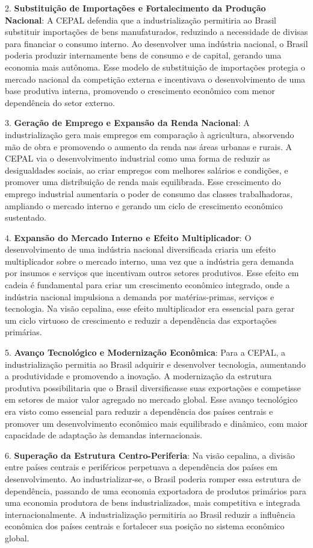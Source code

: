 \documentclass[a4paper,12pt]{article}[abntex2]
\begin{document}
2. \textbf{Substituição de Importações e Fortalecimento da Produção Nacional}: A CEPAL defendia que a industrialização permitiria ao Brasil substituir importações de bens manufaturados, reduzindo a necessidade de divisas para financiar o consumo interno. Ao desenvolver uma indústria nacional, o Brasil poderia produzir internamente bens de consumo e de capital, gerando uma economia mais autônoma. Esse modelo de substituição de importações protegia o mercado nacional da competição externa e incentivava o desenvolvimento de uma base produtiva interna, promovendo o crescimento econômico com menor dependência do setor externo.

3. \textbf{Geração de Emprego e Expansão da Renda Nacional}: A industrialização gera mais empregos em comparação à agricultura, absorvendo mão de obra e promovendo o aumento da renda nas áreas urbanas e rurais. A CEPAL via o desenvolvimento industrial como uma forma de reduzir as desigualdades sociais, ao criar empregos com melhores salários e condições, e promover uma distribuição de renda mais equilibrada. Esse crescimento do emprego industrial aumentaria o poder de consumo das classes trabalhadoras, ampliando o mercado interno e gerando um ciclo de crescimento econômico sustentado.

4. \textbf{Expansão do Mercado Interno e Efeito Multiplicador}: O desenvolvimento de uma indústria nacional diversificada criaria um efeito multiplicador sobre o mercado interno, uma vez que a indústria gera demanda por insumos e serviços que incentivam outros setores produtivos. Esse efeito em cadeia é fundamental para criar um crescimento econômico integrado, onde a indústria nacional impulsiona a demanda por matérias-primas, serviços e tecnologia. Na visão cepalina, esse efeito multiplicador era essencial para gerar um ciclo virtuoso de crescimento e reduzir a dependência das exportações primárias.

5. \textbf{Avanço Tecnológico e Modernização Econômica}: Para a CEPAL, a industrialização permitia ao Brasil adquirir e desenvolver tecnologia, aumentando a produtividade e promovendo a inovação. A modernização da estrutura produtiva possibilitaria que o Brasil diversificasse suas exportações e competisse em setores de maior valor agregado no mercado global. Esse avanço tecnológico era visto como essencial para reduzir a dependência dos países centrais e promover um desenvolvimento econômico mais equilibrado e dinâmico, com maior capacidade de adaptação às demandas internacionais.

6. \textbf{Superação da Estrutura Centro-Periferia}: Na visão cepalina, a divisão entre países centrais e periféricos perpetuava a dependência dos países em desenvolvimento. Ao industrializar-se, o Brasil poderia romper essa estrutura de dependência, passando de uma economia exportadora de produtos primários para uma economia produtora de bens industrializados, mais competitiva e integrada internacionalmente. A industrialização permitiria ao Brasil reduzir a influência econômica dos países centrais e fortalecer sua posição no sistema econômico global.
\end{document}
